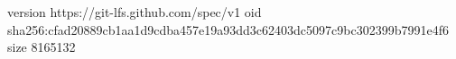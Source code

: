 version https://git-lfs.github.com/spec/v1
oid sha256:cfad20889cb1aa1d9cdba457e19a93dd3c62403dc5097c9bc302399b7991e4f6
size 8165132
